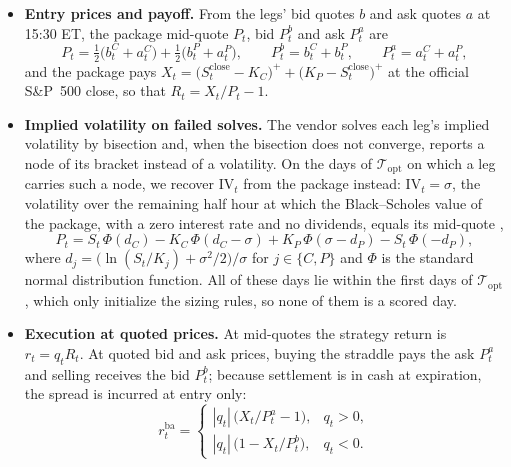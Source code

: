 \begin{itemize}
\item \textbf{Entry prices and payoff.} From the legs' bid quotes $b$ and ask quotes $a$ at 15:30 ET, the package
  mid-quote $P_t$, bid $P^{b}_t$ and ask $P^{a}_t$ are
  \[
  P_t = \tfrac12\bigl(b^C_t + a^C_t\bigr) + \tfrac12\bigl(b^P_t + a^P_t\bigr),
  \qquad
  P^{b}_t = b^C_t + b^P_t, \qquad P^{a}_t = a^C_t + a^P_t ,
  \]
  and the package pays $X_t = \bigl(S^{\mathrm{close}}_t - K_C\bigr)^+ + \bigl(K_P - S^{\mathrm{close}}_t\bigr)^+$ at
  the official S\&P~500 close, so that $R_t = X_t/P_t - 1$.
\item \textbf{Implied volatility on failed solves.} The vendor solves each leg's implied volatility by bisection
  and, when the bisection does not converge, reports a node of its bracket instead of a volatility. On the
  \cmCensIvDays{} days of $\mathcal T_{\mathrm{opt}}$ on which a leg carries such a node, we recover $\mathrm{IV}_t$
  from the package instead: $\mathrm{IV}_t = \sigma$, the volatility over the remaining half hour at which the
  Black--Scholes value of the package, with a zero interest rate and no dividends, equals its mid-quote
  \citep{BlackScholes1973},
  \[
    P_t = S_t\,\Phi(d_C) - K_C\,\Phi(d_C - \sigma) + K_P\,\Phi(\sigma - d_P) - S_t\,\Phi(-d_P),
  \]
  where $d_j = \bigl(\ln(S_t/K_j) + \sigma^2/2\bigr)/\sigma$ for $j \in \{C, P\}$ and $\Phi$ is the standard normal
  distribution function. All of these days lie within the first \rheSzWarmup{} days of $\mathcal T_{\mathrm{opt}}$,
  which only initialize the sizing rules, so none of them is a scored day.
\item \textbf{Execution at quoted prices.} At mid-quotes the strategy return is $r_t = q_t R_t$. At quoted bid and
  ask prices, buying the straddle pays the ask $P^{a}_t$ and selling receives the bid $P^{b}_t$; because settlement
  is in cash at expiration, the spread is incurred at entry only:
  \[
  r^{\mathrm{ba}}_t =
  \begin{cases}
  |q_t|\,\bigl(X_t/P^{a}_t - 1\bigr), & q_t > 0,\\
  |q_t|\,\bigl(1 - X_t/P^{b}_t\bigr), & q_t < 0.
  \end{cases}
  \]
\end{itemize}

